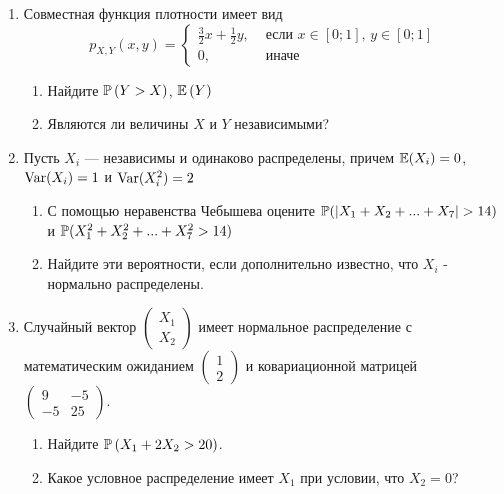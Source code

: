 \begin{enumerate}
\item Совместная функция плотности имеет вид
\[
p_{X,Y} \left(x,y\right)=
\begin{cases}
\frac{3}{2}x+\frac{1}{2}y, & \text{ если } x\in \left[0;1\right],\, y\in \left[0;1\right] \\
0, & \text{ иначе}
\end{cases}
\]
\begin{enumerate}
\item Найдите  $\P\left(Y>X\right)$,  $\E\left(Y\right)$
\item Являются ли величины $X$ и $Y$ независимыми?
\end{enumerate}

\item Пусть $X_{i}$ — независимы и одинаково распределены, причем $\E(X_{i})=0$, $\Var(X_{i})=1$ и $\Var(X_{i}^{2})=2$
\begin{enumerate}
\item С помощью неравенства Чебышева оцените $\P(|X_{1}+X_{2}+...+X_{7}|>14)$ и $\P(X_{1}^{2}+X_{2}^{2}+...+X_{7}^{2}>14)$
\item Найдите эти вероятности, если дополнительно известно, что $X_{i}$ - нормально распределены.
\end{enumerate}

\item Случайный вектор  $\left(\begin{array}{c}
{X_{1} } \\ {X_{2} }
\end{array}\right)$  имеет нормальное распределение с
математическим ожиданием  $\left(\begin{array}{c} {1} \\ {2}
\end{array}\right)$  и ковариационной матрицей
$\left(\begin{array}{cc} {9} & {-5} \\ {-5} & {25}
\end{array}\right)$.
\begin{enumerate}
\item Найдите  $\P\left(X_{1} +2X_{2} >20\right)$.
\item Какое условное распределение имеет $X_{1}$ при условии, что $X_{2}=0$?
\end{enumerate}



\end{enumerate}
